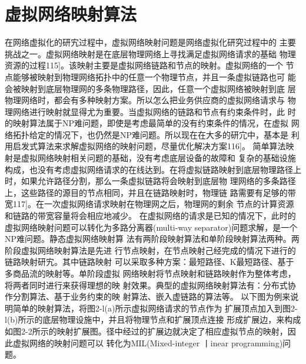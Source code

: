 \section{虚拟网络映射算法}
在网络虚拟化的研宄过程中，虚拟网络映射问题是网络虚拟化研究过程中的 主要挑战之一。虚拟网络映射是在底层物理网络上寻找满足虚拟网络请求的基础 物理资源的过程115]。该映射主要是虚拟网络链路和节点的映射。虚拟网络的一个 节点能够被映射到物理网络拓扑中的任意一个物理节点，并且一条虚拟链路也可 能会被映射到底层物理网的多条物理路径，因此，任意一个虚拟网络被映射到底 层物理网络时，都会有多种映射方案。所以怎么把业务供应商的虚拟网络请求与 物理网络进行映射就显得尤为重要。当虚拟网络的链路和节点有约束条件时，此 时的映射算法属于NP难问题，即使是考虑最简单的没有约束条件的情况，在虚拟 网络拓扑给定的情况下，也仍然是NP难问题。所以现在在大多的研宂中，基本是 利用启发式算法来求解虚拟网络的映射问题，尽量优化解决方案116]。
简单算法映射是虚拟网络映射相关问题的基础，没有考虑底层设备的故障和 复杂的基础设施构成，也没有考虑虚拟网络请求的在线达到。在将虚拟链路映射到底层物理路径上时，如果允许路径分割，那么一条虚拟链路将会映射到底层物 理网络的多条路径上，这些路径的源目的节点相同，并且在链路映射时，物理链 路需要有足够的带宽117]。在一次虚拟网络请求映射在物理网之后，物理网的剩余 节点的计算资源和链路的带宽容量将会相应地减少。
在虚拟网络的请求是已知的情况下，此时的虚拟网络映射问题可以转化为多路分离器(multi-way separator)问题求解，是一个NP难问题。静态虚拟网络映射算 法有两阶段映射算法和单阶段映射算法两种。两阶段虚拟网络映射算法是先进 行节点映射，在节点映射己经完成的情况下进行的链路映射研宄。其中链路映射 可以采取多种方案：最短路径、K最短路径、基于多商品流的映射等。单阶段虚拟 网络映射将节点映射和链路映射作为整体考虑，将两者同时进行来获得理想的映 射效果。典型的虚拟网络映射算法有：分布式协作分割算法、基于业务约束的映 射算法、嵌入虚链路的算法等。
以下图为例来说明简单的映射算法，将图2-l(a)所示虚拟网络请求的节点作为 扩展顶点加入到图2-l(b)所示的底层物理设施中，并且将物理节点和扩展顶点连接 形成扩展边，来构成如图2-2所示的映射扩展图。径中经过的扩展边就决定了相应虚拟节点的映射，因此虚拟网络的映射问题可以 转化为MIL(Mixed-integer 丨inear programming)问题。

